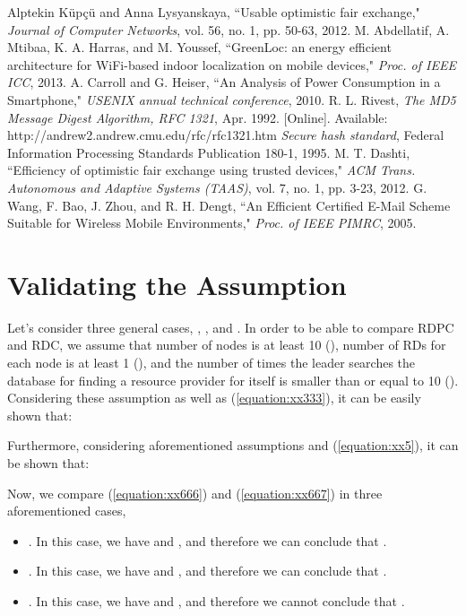 \documentclass[journal,12pt, onecolumn]{IEEEtran}
\begin{document}
\begin{thebibliography}{31}
Alptekin K{\"u}p{\c{c}}{\"u} and Anna Lysyanskaya, ``Usable optimistic fair exchange," \textit{Journal of Computer Networks}, vol. 56, no. 1, pp. 50-63, 2012.
M. Abdellatif, A. Mtibaa, K. A. Harras, and M. Youssef, ``GreenLoc: an energy efficient architecture for WiFi-based indoor localization on mobile devices," \textit{Proc. of IEEE ICC}, 2013.
A. Carroll and G. Heiser, ``An Analysis of Power Consumption in a Smartphone," \textit{USENIX annual technical conference}, 2010.
R. L. Rivest, \textit{The MD5 Message Digest Algorithm, RFC 1321}, Apr. 1992. [Online]. Available: http://andrew2.andrew.cmu.edu/rfc/rfc1321.htm
\textit{Secure hash standard}, Federal Information Processing Standards Publication 180-1, 1995.
M. T. Dashti, ``Efficiency of optimistic fair exchange using trusted devices," \textit{ACM Trans. Autonomous and Adaptive Systems (TAAS)}, vol. 7, no. 1, pp. 3-23, 2012.
G. Wang, F. Bao, J. Zhou, and R. H. Dengt, ``An Efficient Certified E-Mail Scheme Suitable for Wireless Mobile Environments," \textit{Proc. of IEEE PIMRC}, 2005.


\end{thebibliography}






\newpage
\appendices
\section{Validating the Assumption }
\label{validating}
Let's consider three general cases, , , and . In order to be able to compare RDPC and RDC, we assume that number of nodes is at least 10 (), number of RDs for each node is at least 1 (), and the number of times the leader searches the database for finding a resource provider for itself is smaller than or equal to 10 (). Considering these assumption as well as (\ref{equation:xx333}), it can be easily shown that:
 
Furthermore, considering aforementioned assumptions and (\ref{equation:xx5}), it can be shown that:
 
Now, we compare (\ref{equation:xx666}) and (\ref{equation:xx667}) in three aforementioned cases,
\begin{itemize}
\item . In this case, we have  and  , and therefore we can conclude that . 
\item . In this case, we have  and  , and therefore we can conclude that .
\item . In this case, we have  and  , and therefore we cannot conclude that .
\end{itemize}
\end{document}
